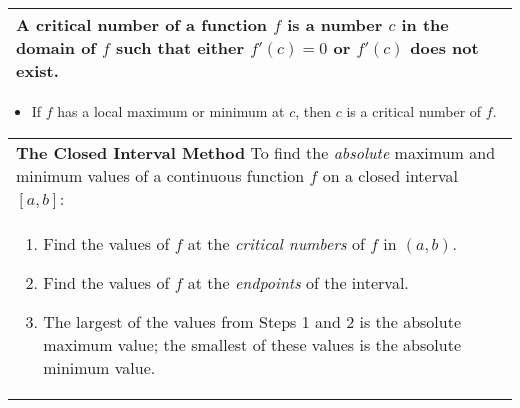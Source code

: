 \documentclass{article}
\begin{document}
\begin{center}
\large
\def\arraystretch{1.3}
{\setlength{\tabcolsep}{16pt}
\begin{tabularx}{.9\textwidth}{|X|}
\hline
	A \textbf{critical number} of a function $f$ is a number $c$ in the domain of $f$ such that either $f'(c) = 0$ or $f'(c)$ does not exist. \\
\hline
\end{tabularx}}
\end{center}

\large
\vspace{5pt}
\begin{itemize}[leftmargin=5pt]
	\item If $f$ has a local maximum or minimum at $c$, then $c$ is a critical number of $f$.
\end{itemize}
\vspace{12pt}
\pagebreak

\begin{center}
\large
\def\arraystretch{1.3}
{\setlength{\tabcolsep}{16pt}
\begin{tabularx}{.9\textwidth}{|X|}
\hline
	\vspace{5pt}
	\textbf{The Closed Interval Method} \: To find the \textit{absolute} maximum and minimum values of a continuous function $f$ on a closed interval $[a,b]$: \\
	\begin{enumerate}[itemsep=5pt]
	\item Find the values of $f$ at the \textit{critical numbers} of $f$ in $(a,b)$.
	\item Find the values of $f$ at the \textit{endpoints} of the interval.
	\item The largest of the values from Steps 1 and 2 is the absolute maximum value; the smallest of these values is the absolute minimum value.
	\end{enumerate} \\
	\hline
\end{tabularx}}
\end{center}
\vspace{24pt}
\end{document}
